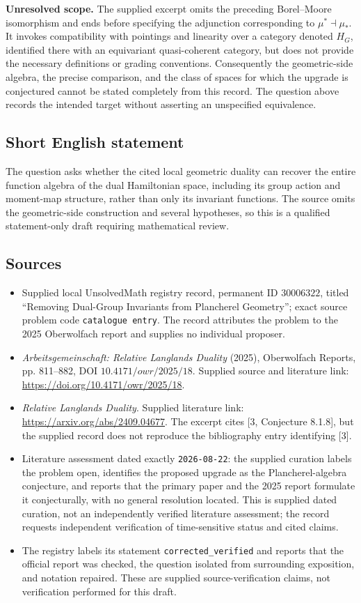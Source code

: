 \documentclass[11pt]{article}
\begin{document}
\textbf{Unresolved scope.} The supplied excerpt omits the preceding Borel--Moore isomorphism and ends before specifying the adjunction corresponding to \(\mu^*\dashv\mu_*\). It invokes compatibility with pointings and linearity over a category denoted \(H_G\), identified there with an equivariant quasi-coherent category, but does not provide the necessary definitions or grading conventions. Consequently the geometric-side algebra, the precise comparison, and the class of spaces for which the upgrade is conjectured cannot be stated completely from this record. The question above records the intended target without asserting an unspecified equivalence.
\subsection{Short English statement}
The question asks whether the cited local geometric duality can recover the entire function algebra of the dual Hamiltonian space, including its group action and moment-map structure, rather than only its invariant functions. The source omits the geometric-side construction and several hypotheses, so this is a qualified statement-only draft requiring mathematical review.
\subsection{Sources}
\begin{itemize}
\item Supplied local UnsolvedMath registry record, permanent ID \(30006322\), titled ``Removing Dual-Group Invariants from Plancherel Geometry''; exact source problem code \texttt{catalogue entry}. The record attributes the problem to the 2025 Oberwolfach report and supplies no individual proposer.
\item \emph{Arbeitsgemeinschaft: Relative Langlands Duality} (2025), Oberwolfach Reports, pp. 811--882, DOI \(10.4171/owr/2025/18\). Supplied source and literature link: \url{https://doi.org/10.4171/owr/2025/18}.
\item \emph{Relative Langlands Duality}. Supplied literature link: \url{https://arxiv.org/abs/2409.04677}. The excerpt cites [3, Conjecture 8.1.8], but the supplied record does not reproduce the bibliography entry identifying [3].
\item Literature assessment dated exactly \texttt{2026-08-22}: the supplied curation labels the problem open, identifies the proposed upgrade as the Plancherel-algebra conjecture, and reports that the primary paper and the 2025 report formulate it conjecturally, with no general resolution located. This is supplied dated curation, not an independently verified literature assessment; the record requests independent verification of time-sensitive status and cited claims.
\item The registry labels its statement \texttt{corrected\_verified} and reports that the official report was checked, the question isolated from surrounding exposition, and notation repaired. These are supplied source-verification claims, not verification performed for this draft.
\end{itemize}
\end{document}
